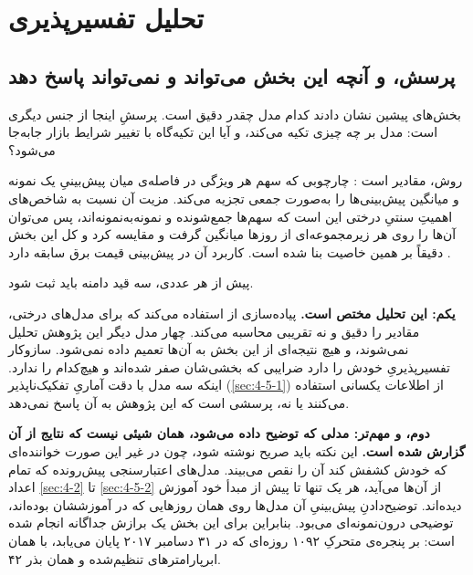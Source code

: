 
\section{تحلیل تفسیرپذیری }
\label{sec:4-6}

\subsection*{پرسش، و آنچه این بخش می‌تواند و نمی‌تواند پاسخ دهد}

بخش‌های پیشین نشان دادند کدام مدل چقدر دقیق است. پرسشِ اینجا از جنس دیگری است:
مدل بر چه چیزی تکیه می‌کند، و آیا این تکیه‌گاه با تغییر شرایط بازار جابه‌جا
می‌شود؟

روش، مقادیر  است \cite{lundberg_unified_2017}: چارچوبی که سهم هر ویژگی
در فاصله‌ی میان پیش‌بینیِ یک نمونه و میانگین پیش‌بینی‌ها را به‌صورت جمعی تجزیه
می‌کند. مزیت آن نسبت به شاخص‌های اهمیتِ سنتیِ درختی این است که سهم‌ها جمع‌شونده و
نمونه‌به‌نمونه‌اند، پس می‌توان آن‌ها را روی هر زیرمجموعه‌ای از روزها میانگین گرفت و
مقایسه کرد  و کل این بخش دقیقاً بر همین خاصیت بنا شده است. کاربرد آن در
پیش‌بینی قیمت برق سابقه دارد \cite{trebbien_explainable_2023}.

پیش از هر عددی، سه قید دامنه باید ثبت شود.

\textbf{یکم: این تحلیل مختص  است.} پیاده‌سازی از
 استفاده می‌کند که برای مدل‌های درختی، مقادیر  را
دقیق و نه تقریبی محاسبه می‌کند. چهار مدل دیگر این پژوهش تحلیل نمی‌شوند، و هیچ
نتیجه‌ای از این بخش به آن‌ها تعمیم داده نمی‌شود.  سازوکار
تفسیرپذیریِ خودش را دارد  ضرایبی که بخشی‌شان صفر شده‌اند  و
 هیچ‌کدام را ندارد. اینکه سه مدل با دقت آماریِ تفکیک‌ناپذیر
(\cref{sec:4-5-1}) از اطلاعات یکسانی استفاده می‌کنند یا نه، پرسشی است که این
پژوهش به آن پاسخ نمی‌دهد.

\textbf{دوم، و مهم‌تر: مدلی که توضیح داده می‌شود، همان شیئی نیست که نتایج از آن
گزارش شده است.} این نکته باید صریح نوشته شود، چون در غیر این صورت خواننده‌ای که
خودش کشفش کند آن را نقص می‌بیند. مدل‌های اعتبارسنجی پیش‌رونده که تمام اعداد
\cref{sec:4-2} تا \cref{sec:4-5-2} از آن‌ها می‌آید، هر یک تنها تا پیش از مبدأ خود
آموزش دیده‌اند. توضیح‌دادنِ پیش‌بینیِ آن مدل‌ها روی همان روزهایی که در
آموزششان بوده‌اند، توضیحی درون‌نمونه‌ای می‌بود. بنابراین برای این بخش یک برازش
جداگانه انجام شده است:  بر پنجره‌ی متحرکِ ۱۰۹۲ روزه‌ای که در
۳۱ دسامبر ۲۰۱۷ پایان می‌یابد، با همان ابرپارامترهای تنظیم‌شده و همان بذر ۴۲.

